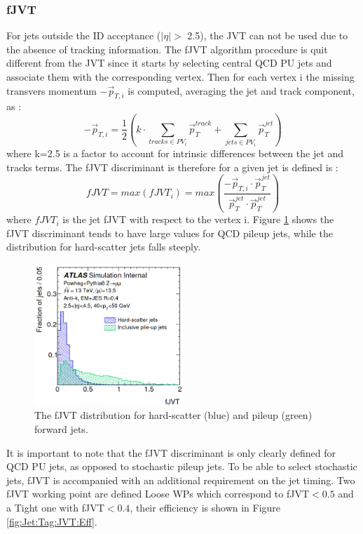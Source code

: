 \subsubsection{fJVT}
\label{Jet:Tag:JVT:fJVT}
For jets outside the ID acceptance ($|\eta|>$ 2.5), the JVT can not be used due to the absence of tracking information. The fJVT algorithm procedure is quit different from the JVT since it starts by selecting central QCD PU jets and associate them with the corresponding vertex. Then for each vertex i the missing transvers momentum $-\vec{p}_{T, i}$ is computed, averaging the jet and track component, as :
\begin{equation}
    -\vec{p}_{T, i}=\frac{1}{2}\left(k \cdot \sum_{tracks \in P V_{i}} \vec{p}_{T}^{track }+\sum_{jets \in PV_{i}} \vec{p}_{T}^{jet}\right)
\end{equation}
where k=2.5 is a factor to account for intrinsic differences between the jet and tracks terms. The fJVT discriminant is therefore for a given jet is defined is :
\begin{equation}
    fJVT = max(fJVT_i) = max(\frac{-\vec{p}_{T, i} \cdot \vec{p}_{T}^{j e t}}{\vec{p}_{T}^{j e t} \cdot \vec{p}_{T}^{j e t}})
\end{equation}
where $fJVT_i$ is the jet fJVT with respect to the vertex i. Figure \ref{fig:Jet:Tag:JVT:fJVT} shows the fJVT discriminant tends to have large values for QCD pileup jets, while the distribution for hard-scatter jets falls steeply.
\begin{figure}[htbp]
    \centering
    \includegraphics[width=0.5\textwidth]{Ch4/Img/fJVT.png}
    \caption{The fJVT distribution for hard-scatter (blue) and pileup (green) forward jets.}
    \label{fig:Jet:Tag:JVT:fJVT}
\end{figure}
It is important to note that the fJVT discriminant is only clearly defined for QCD PU jets, as opposed to stochastic pileup jets. To be able to select stochastic jets, fJVT is accompanied with an additional requirement on the jet timing. Two fJVT working point are defined Loose WPs which correspond to fJVT$<0.5$ and a Tight one with fJVT$<0.4$, their efficiency is shown in Figure \ref{fig:Jet:Tag:JVT:Eff}.

